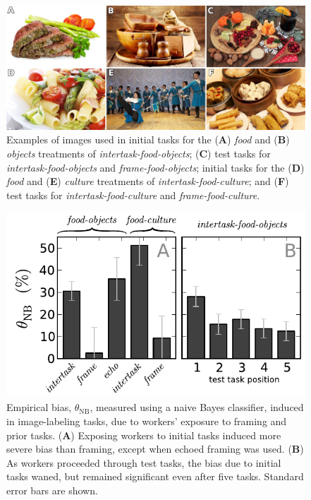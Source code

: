 \documentclass{sigchi}
\begin{document}
\begin{figure}
	\centering
	\includegraphics[scale=1.0]{figs/images.jpg}
	\caption{
		Examples of images used in
		initial tasks for the (\textbf{A}) \textit{food} and (\textbf{B}) 
		\textit{objects} treatments of \textit{intertask-food-objects};
		(\textbf{C}) test tasks for \textit{intertask-food-objects} and 
		\textit{frame-food-objects};
		initial tasks for the (\textbf{D}) \textit{food} and (\textbf{E}) 
		\textit{culture} treatments of \textit{intertask-food-culture};
		and (\textbf{F}) test tasks for \textit{intertask-food-culture} and 
		\textit{frame-food-culture}.
	}

	\label{fig:task}
\end{figure}

\begin{figure}[t]
	\includegraphics[scale=0.75]{figs/theta.pdf}
	\caption{
		Empirical bias, $\theta_\mathrm{NB}$, measured using a naive Bayes 
		classifier, induced in image-labeling tasks, due to workers' 
		exposure to framing and prior tasks.  
		(\textbf{A}) Exposing workers to initial tasks induced more severe
		bias than framing, except when echoed framing was used. 
		(\textbf{B}) As workers proceeded through test tasks, 
		the bias due to initial tasks waned, 
		but remained significant even after five tasks.  
		Standard error bars are shown.
	}
	\label{fig:theta}
\end{figure}
\end{document}
